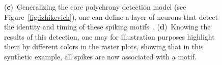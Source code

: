 \documentclass[brainsci, %
               review,accept,pdftex,moreauthors
               ]{Definitions/mdpi}
\begin{document}
\begin{figure}[H]
{      { (\textbf{c})}~Generalizing the core polychrony detection model (see Figure~\ref{fig:izhikevich}), one can define a layer of neurons that detect the identity and timing of these spiking motifs~\citep{grimaldi_learning_2022}. %
      { (\textbf{d})}~Knowing the %
   results of this detection, one may for illustration purposes highlight them by different colors in the raster plots, showing that in this synthetic example, all spikes are now associated with a motif. 
       }
    \label{fig:THC} %
  \end{figure}
% 
\end{document}
